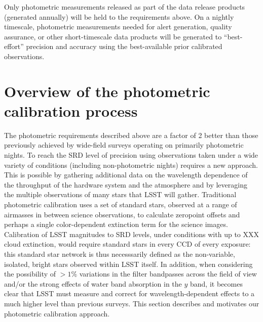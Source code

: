 \documentclass[12pt,preprint]{aastex}
\begin{document}
Only photometric measurements released as part of the data release
products (generated annually) will be held to the requirements
above. On a nightly timescale, photometric measurements needed for
alert generation, quality assurance, or other short-timescale data
products will be generated to ``best-effort'' precision and accuracy
using the best-available prior calibrated observations.

\section{Overview of the photometric calibration process}

The photometric requirements described above are a factor of 2 better
than those previously achieved by wide-field surveys operating on
primarily photometric nights. To reach the SRD level of precision using
observations taken under a wide variety of conditions (including
non-photometric nights) requires a new approach. This is possible by
gathering additional data on the wavelength dependence of the
throughput of the hardware system and the atmosphere and by leveraging
the multiple observations of many stars that LSST will
gather. Traditional photometric calibration uses a set of standard
stars, observed at a range of airmasses in between science
observations, to calculate zeropoint offsets and perhaps a single
color-dependent extinction term for the science images. Calibration of
LSST magnitudes to SRD levels, under conditions with up to XXX cloud
extinction, would require standard stars in every CCD of every
exposure: this standard star network is thus necesssarily defined as the
non-variable, isolated, bright stars observed within LSST itself. In
addition, when considering the possibility of $>1\%$ variations in the
filter bandpasses across the field of view and/or the strong effects
of water band absorption in the $y$ band, it becomes clear that LSST
must measure and correct for wavelength-dependent effects to a much
higher level than previous surveys. This section describes and motivates our
photometric calibration approach. 
\end{document}
